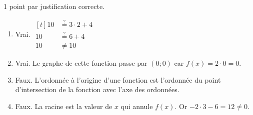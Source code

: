 %
%
    1 point par justification correcte.
    \begin{enumerate}
        \item Vrai.
              $\begin{aligned}[t]
                      10 & \stackrel{?}{=} 3\cdot 2 + 4 \\
                      10 & \stackrel{?}{=} 6 + 4        \\
                      10 & \ne 10
                  \end{aligned}$
        \item Vrai. Le graphe de cette fonction passe par $(0;0)$ car $f(x) = 2\cdot 0 = 0$.
        \item Faux. L'ordonnée à l'origine d'une fonction est l'ordonnée du point d'intersection de la fonction avec l'axe des ordonnées.
        \item Faux. La racine est la valeur de $x$ qui annule $f(x)$. Or $-2\cdot 3 - 6 = 12 \ne 0$.
    \end{enumerate}
